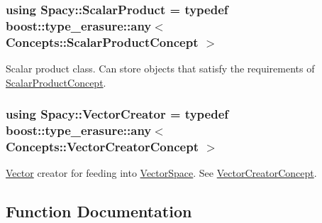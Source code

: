 \label{group__SpacyGroup_ga3f89622eba80cf840b2a7102f1303455_OperatorAnchor}%
\hypertarget{group__SpacyGroup_ga3f89622eba80cf840b2a7102f1303455_OperatorAnchor}{}%
\hypertarget{group__SpacyGroup_ga9fe0b4de20da1ab1ca3d04a0f96343e1_ga9fe0b4de20da1ab1ca3d04a0f96343e1}{}
\subsubsection[{Scalar\+Product}]{\setlength{\rightskip}{0pt plus 5cm}using {\bf Spacy\+::\+Scalar\+Product} = typedef boost\+::type\+\_\+erasure\+::any$<$ Concepts\+::\+Scalar\+Product\+Concept $>$}\label{group__SpacyGroup_ga9fe0b4de20da1ab1ca3d04a0f96343e1_ga9fe0b4de20da1ab1ca3d04a0f96343e1}


Scalar product class. Can store objects that satisfy the requirements of \hyperlink{group__ConceptGroup_ga1308724cda3078f228fb05c29556805d_ScalarProductConceptAnchor}{Scalar\+Product\+Concept}. 

\label{group__SpacyGroup_ga9fe0b4de20da1ab1ca3d04a0f96343e1_ScalarProductAnchor}%
\hypertarget{group__SpacyGroup_ga9fe0b4de20da1ab1ca3d04a0f96343e1_ScalarProductAnchor}{}%
\hypertarget{group__SpacyGroup_ga1f5316487c031a478247206764bb2efb_ga1f5316487c031a478247206764bb2efb}{}
\subsubsection[{Vector\+Creator}]{\setlength{\rightskip}{0pt plus 5cm}using {\bf Spacy\+::\+Vector\+Creator} = typedef boost\+::type\+\_\+erasure\+::any$<$ Concepts\+::\+Vector\+Creator\+Concept $>$}\label{group__SpacyGroup_ga1f5316487c031a478247206764bb2efb_ga1f5316487c031a478247206764bb2efb}


\hyperlink{classSpacy_1_1Vector}{Vector} creator for feeding into \hyperlink{classSpacy_1_1VectorSpace}{Vector\+Space}. See \hyperlink{group__ConceptGroup_ga3064301642b7c66b1b08f88a12a04645_VectorCreatorConceptAnchor}{Vector\+Creator\+Concept}. 

\label{group__SpacyGroup_ga1f5316487c031a478247206764bb2efb_VectorCreatorAnchor}%
\hypertarget{group__SpacyGroup_ga1f5316487c031a478247206764bb2efb_VectorCreatorAnchor}{}%


\subsection{Function Documentation}
\hypertarget{group__SpacyGroup_gaf74aa266d04acaba7263ee8d36b5b906_gaf74aa266d04acaba7263ee8d36b5b906}{}
